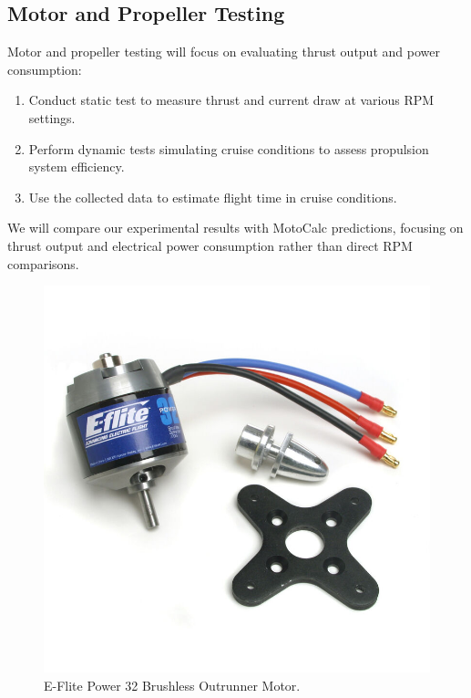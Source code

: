 
\newpage

\subsection{Motor and Propeller Testing}

Motor and propeller testing will focus on evaluating thrust output and power consumption:

\begin{enumerate}
    \item Conduct static test to measure thrust and current draw at various RPM settings.
    \item Perform dynamic tests simulating cruise conditions to assess propulsion system efficiency.
    \item Use the collected data to estimate flight time in cruise conditions.
\end{enumerate}

We will compare our experimental results with MotoCalc predictions, focusing on thrust output and electrical power consumption rather than direct RPM comparisons.


\begin{figure}[htpb]
    \centering
    \includegraphics[width=0.88\linewidth]{figures/propulsion_data/eflitepower32.jpg}
    \caption{E-Flite Power 32 Brushless Outrunner Motor.}
    \label{fig:eflitepower32}
\end{figure}

